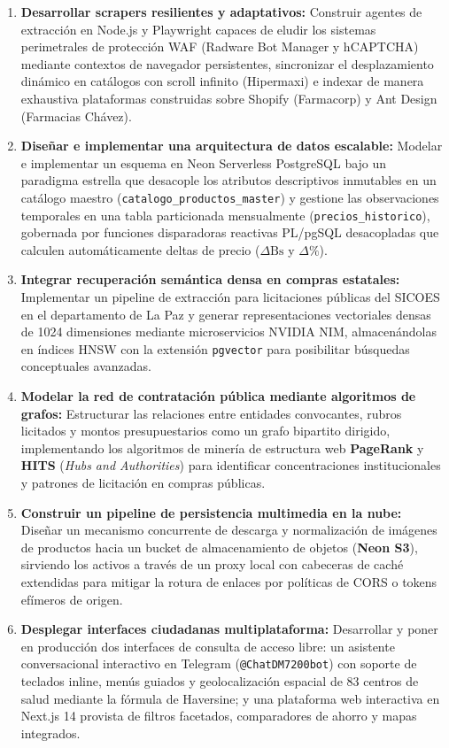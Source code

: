 \begin{enumerate}[leftmargin=*, label=\textbf{\arabic*.}]
    \item \textbf{Desarrollar scrapers resilientes y adaptativos:} Construir agentes de extracción en Node.js y Playwright capaces de eludir los sistemas perimetrales de protección WAF (Radware Bot Manager y hCAPTCHA) mediante contextos de navegador persistentes, sincronizar el desplazamiento dinámico en catálogos con scroll infinito (Hipermaxi) e indexar de manera exhaustiva plataformas construidas sobre Shopify (Farmacorp) y Ant Design (Farmacias Chávez).
    
    \item \textbf{Diseñar e implementar una arquitectura de datos escalable:} Modelar e implementar un esquema en Neon Serverless PostgreSQL bajo un paradigma estrella que desacople los atributos descriptivos inmutables en un catálogo maestro (\texttt{catalogo\_productos\_master}) y gestione las observaciones temporales en una tabla particionada mensualmente (\texttt{precios\_historico}), gobernada por funciones disparadoras reactivas PL/pgSQL desacopladas que calculen automáticamente deltas de precio ($\Delta\text{Bs}$ y $\Delta\%$).
    
    \item \textbf{Integrar recuperación semántica densa en compras estatales:} Implementar un pipeline de extracción para licitaciones públicas del SICOES en el departamento de La Paz y generar representaciones vectoriales densas de 1024 dimensiones mediante microservicios NVIDIA NIM, almacenándolas en índices HNSW con la extensión \texttt{pgvector} para posibilitar búsquedas conceptuales avanzadas.
    
    \item \textbf{Modelar la red de contratación pública mediante algoritmos de grafos:} Estructurar las relaciones entre entidades convocantes, rubros licitados y montos presupuestarios como un grafo bipartito dirigido, implementando los algoritmos de minería de estructura web \textbf{PageRank} y \textbf{HITS} (\textit{Hubs and Authorities}) para identificar concentraciones institucionales y patrones de licitación en compras públicas.
    
    \item \textbf{Construir un pipeline de persistencia multimedia en la nube:} Diseñar un mecanismo concurrente de descarga y normalización de imágenes de productos hacia un bucket de almacenamiento de objetos (\textbf{Neon S3}), sirviendo los activos a través de un proxy local con cabeceras de caché extendidas para mitigar la rotura de enlaces por políticas de CORS o tokens efímeros de origen.
    
    \item \textbf{Desplegar interfaces ciudadanas multiplataforma:} Desarrollar y poner en producción dos interfaces de consulta de acceso libre: un asistente conversacional interactivo en Telegram (\texttt{@ChatDM7200bot}) con soporte de teclados inline, menús guiados y geolocalización espacial de 83 centros de salud mediante la fórmula de Haversine; y una plataforma web interactiva en Next.js 14 provista de filtros facetados, comparadores de ahorro y mapas integrados.
\end{enumerate}
